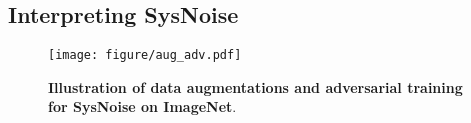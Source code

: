 










    



\subsection{Interpreting SysNoise}

\label{sec_interp}

\begin{figure*}[htbp]
    \centering
    \texttt{[image: figure/aug\_adv.pdf]}
    \caption{\textbf{Illustration of data augmentations and adversarial training for SysNoise on ImageNet}. }
    \label{fig_aug_adv}
\end{figure*}

